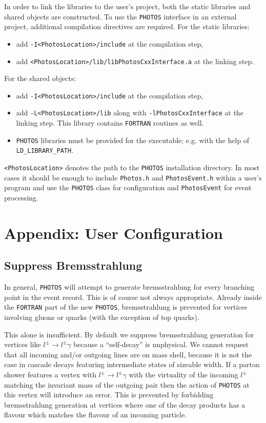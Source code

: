 \documentclass[]{Photos_interface_design}
\begin{document}
In order to link the libraries to the user's project, both the static libraries and shared objects are
constructed. To use the {\tt PHOTOS} interface in an external project, additional 
compilation directives are required. For the static libraries:
\begin{itemize}
  \item add {\tt -I<PhotosLocation>/include} at the compilation step,
  \item add {\tt <PhotosLocation>/lib/libPhotosCxxInterface.a} at the linking step.
\end{itemize}
For the shared objects:
\begin{itemize}
  \item add {\tt -I<PhotosLocation>/include} at the compilation step,
  \item add {\tt -L<PhotosLocation>/lib} along with {\tt -lPhotosCxxInterface} at the linking step.
        This library contains {\tt FORTRAN} routines as well.
  \item  {\tt PHOTOS} libraries must be provided for the executable; e.g. with the help of {\tt LD\_LIBRARY\_PATH}.
\end{itemize}
{\tt <PhotosLocation>} denotes the path to the {\tt PHOTOS} installation directory.
In most cases it should be enough to include {\tt Photos.h} and {\tt PhotosEvent.h}
within a user's program and use the {\tt PHOTOS} class for configuration and {\tt PhotosEvent}
for event processing.

\section{Appendix: User Configuration}
\label{sec:User Configuration}

\subsection{Suppress Bremsstrahlung}
\label{section:suppress}

In general, {\tt PHOTOS} will attempt to generate bremsstrahlung for every 
branching point in the event record. This is of course not always appropriate.
Already inside the {\tt FORTRAN} part of the new {\tt PHOTOS}, bremsstrahlung is prevented for vertices involving gluons or quarks 
(with the exception of top quarks).

This alone is insufficient. By default we suppress bremsstrahlung
generation for vertices like $l^\pm \to l^\pm \gamma$ because a
``self-decay'' is unphysical. We cannot request that all incoming
and/or outgoing lines are on mass shell, because it is not the case in
cascade decays featuring intermediate states of sizeable width. If a
parton shower features a vertex with $l^\pm \to l^\pm \gamma$ with the
virtuality of the incoming $l^\pm$ matching the invariant mass of the
outgoing pair then the action of {\tt PHOTOS} at this vertex will
introduce an error.  This is prevented by forbidding bremsstrahlung
generation at vertices where one of the decay products has a flavour
which matches the flavour of an incoming particle.
\end{document}
